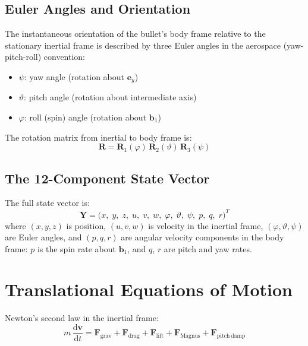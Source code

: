 \documentclass[11pt,twoside,openright]{report}
\newcommand{\dd}{\mathrm{d}}
\newcommand{\vvec}{\bm{v}}
\begin{document}
\subsection{Euler Angles and Orientation}

The instantaneous orientation of the bullet's body frame relative to the stationary inertial frame is described by three Euler angles in the aerospace (yaw-pitch-roll) convention:

\begin{itemize}[nosep]
  \item $\psi$: yaw angle (rotation about $\bm{e}_y$)
  \item $\vartheta$: pitch angle (rotation about intermediate axis)
  \item $\varphi$: roll (spin) angle (rotation about $\bm{b}_1$)
\end{itemize}

The rotation matrix from inertial to body frame is:
\begin{equation}
  \bm{R} = \bm{R}_1(\varphi)\,\bm{R}_2(\vartheta)\,\bm{R}_3(\psi)
  \label{eq:rotation_matrix}
\end{equation}

\subsection{The 12-Component State Vector}

The full state vector is:
\begin{equation}
  \bm{Y} = \bigl(x,\; y,\; z,\; u,\; v,\; w,\; \varphi,\; \vartheta,\; \psi,\; p,\; q,\; r\bigr)^T
  \label{eq:6dof_state}
\end{equation}
where $(x,y,z)$ is position, $(u,v,w)$ is velocity in the inertial frame, $(\varphi, \vartheta, \psi)$ are Euler angles, and $(p, q, r)$ are angular velocity components in the body frame: $p$ is the spin rate about $\bm{b}_1$, and $q$, $r$ are pitch and yaw rates.

\section{Translational Equations of Motion}

Newton's second law in the inertial frame:
\begin{equation}
  \boxed{m\,\frac{\dd \vvec}{\dd t} = \bm{F}_{\mathrm{grav}} + \bm{F}_{\mathrm{drag}} + \bm{F}_{\mathrm{lift}} + \bm{F}_{\mathrm{Magnus}} + \bm{F}_{\mathrm{pitch\,damp}}}
  \label{eq:6dof_trans}
\end{equation}
\end{document}

